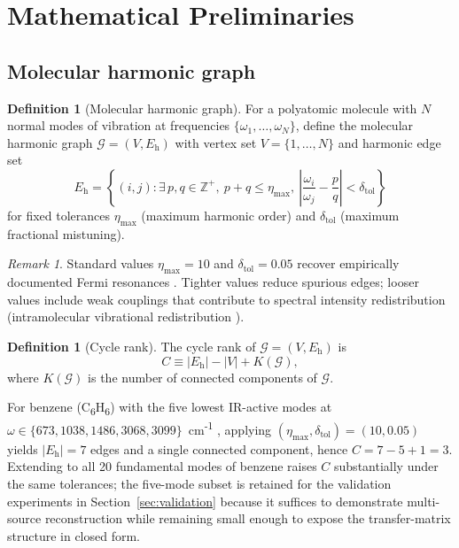 \documentclass[11pt,twocolumn,a4paper]{article}
\theoremstyle{definition}
\newtheorem{definition}[theorem]{Definition}
\theoremstyle{remark}
\newtheorem{remark}[theorem]{Remark}
\newcommand{\Graph}{\mathcal{G}}
\newcommand{\VertexSet}{V}
\newcommand{\HarmSet}{E_{\mathrm{h}}}
\begin{document}
\section{Mathematical Preliminaries}
\label{sec:preliminaries}

\subsection{Molecular harmonic graph}

\begin{definition}[Molecular harmonic graph]
\label{def:harmonic_graph}
For a polyatomic molecule with $N$ normal modes of vibration at frequencies $\{\omega_1, \ldots, \omega_N\}$, define the molecular harmonic graph $\Graph = (\VertexSet, \HarmSet)$ with vertex set $\VertexSet = \{1, \ldots, N\}$ and harmonic edge set
\begin{equation}
\HarmSet = \left\{(i, j) : \exists\, p, q \in \mathbb{Z}^+,\ p + q \leq \eta_{\max},\ \left|\frac{\omega_i}{\omega_j} - \frac{p}{q}\right| < \delta_{\mathrm{tol}}\right\}
\end{equation}
for fixed tolerances $\eta_{\max}$ (maximum harmonic order) and $\delta_{\mathrm{tol}}$ (maximum fractional mistuning).
\end{definition}

\begin{remark}
Standard values $\eta_{\max} = 10$ and $\delta_{\mathrm{tol}} = 0.05$ recover empirically documented Fermi resonances \citep{fermi1931,herzberg1945}. Tighter values reduce spurious edges; looser values include weak couplings that contribute to spectral intensity redistribution (intramolecular vibrational redistribution \citep{nesbitt1996}).
\end{remark}

\begin{definition}[Cycle rank]
\label{def:cycle_rank}
The cycle rank of $\Graph = (\VertexSet, \HarmSet)$ is
\begin{equation}
C \equiv |\HarmSet| - |\VertexSet| + K(\Graph),
\end{equation}
where $K(\Graph)$ is the number of connected components of $\Graph$.
\end{definition}

\begin{example}
For benzene (C\textsubscript{6}H\textsubscript{6}) with the five lowest IR-active modes at $\omega \in \{673, 1038, 1486, 3068, 3099\}$~cm\textsuperscript{-1} \citep{cccbdb}, applying $(\eta_{\max}, \delta_{\mathrm{tol}}) = (10, 0.05)$ yields $|\HarmSet| = 7$ edges and a single connected component, hence $C = 7 - 5 + 1 = 3$. Extending to all 20 fundamental modes of benzene raises $C$ substantially under the same tolerances; the five-mode subset is retained for the validation experiments in Section~\ref{sec:validation} because it suffices to demonstrate multi-source reconstruction while remaining small enough to expose the transfer-matrix structure in closed form.
\end{example}
\end{document}
